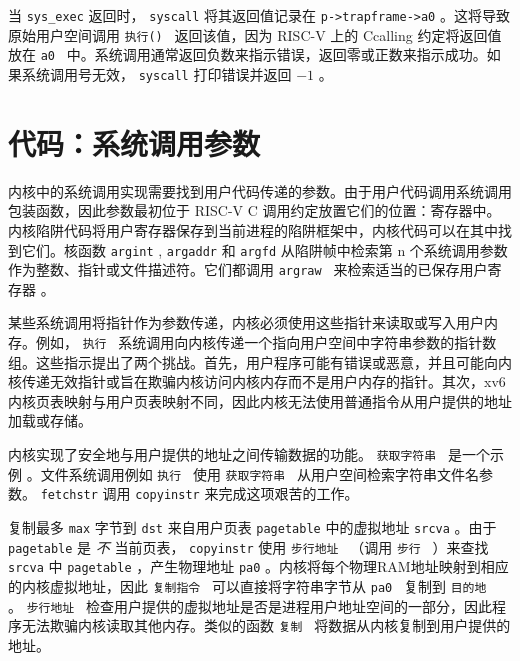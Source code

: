 \documentclass[UTF8]{article}
\begin{document}
当    \lstinline{sys_exec}    返回时，
    \lstinline{syscall}   将其返回值记录在
    \lstinline{p->trapframe->a0}    。这将导致原始用户空间调用
  {    \tt    执行()   }  返回该值，因为 RISC-V 上的 Ccalling 约定将返回值放在  {    \tt    a0   }  中。系统调用通常返回负数来指示错误，返回零或正数来指示成功。如果系统调用号无效，
    \lstinline{syscall}    打印错误并返回    $-1$    。  

   \section{代码：系统调用参数  }     

内核中的系统调用实现需要找到用户代码传递的参数。由于用户代码调用系统调用包装函数，因此参数最初位于 RISC-V C 调用约定放置它们的位置：寄存器中。内核陷阱代码将用户寄存器保存到当前进程的陷阱框架中，内核代码可以在其中找到它们。核函数
    \lstinline{argint}    ,
    \lstinline{argaddr}    和
    \lstinline{argfd}    从陷阱帧中检索第 n 个系统调用参数作为整数、指针或文件描述符。它们都调用  {    \tt    argraw   }  来检索适当的已保存用户寄存器
        。  

某些系统调用将指针作为参数传递，内核必须使用这些指针来读取或写入用户内存。例如， {    \tt    执行   }  系统调用向内核传递一个指向用户空间中字符串参数的指针数组。这些指示提出了两个挑战。首先，用户程序可能有错误或恶意，并且可能向内核传递无效指针或旨在欺骗内核访问内核内存而不是用户内存的指针。其次，xv6 内核页表映射与用户页表映射不同，因此内核无法使用普通指令从用户提供的地址加载或存储。  

内核实现了安全地与用户提供的地址之间传输数据的功能。
  {    \tt    获取字符串   }  是一个示例        。文件系统调用例如
  {    \tt    执行   }  使用  {    \tt    获取字符串   }  从用户空间检索字符串文件名参数。
    \lstinline{fetchstr}    调用    \lstinline{copyinstr}    来完成这项艰苦的工作。  

        复制最多    \lstinline{max}    字节到
    \lstinline{dst}    来自用户页表    \lstinline{pagetable}    中的虚拟地址    \lstinline{srcva}    。由于    \lstinline{pagetable}    是  {    \it    不   }  当前页表，
    \lstinline{copyinstr}    使用  {    \tt    步行地址   }  （调用  {    \tt    步行   }  ）来查找
    \lstinline{srcva}    中
    \lstinline{pagetable}    ，产生物理地址    \lstinline{pa0}    。内核将每个物理RAM地址映射到相应的内核虚拟地址，因此
  {    \tt    复制指令   }  可以直接将字符串字节从  {    \tt    pa0   }  复制到  {    \tt    目的地   }  。
  {    \tt    步行地址   } 
        检查用户提供的虚拟地址是否是进程用户地址空间的一部分，因此程序无法欺骗内核读取其他内存。类似的函数  {    \tt    复制   }  将数据从内核复制到用户提供的地址。  
\end{document}
